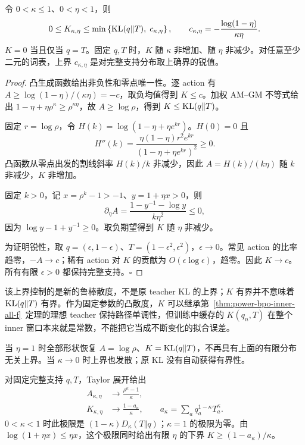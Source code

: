 \begin{theorem}[教师中心的分布无关界]
\label{thm:center-bounds-monotonicity}
令 $0<\kappa\le1$、$0<\eta<1$，则
\begin{equation}
 0\le K_{\kappa,\eta}
 \le\min\left\{\operatorname{KL}(q\Vert T),\;
 c_{\kappa,\eta}\right\},\qquad
 c_{\kappa,\eta}=-\frac{\log(1-\eta)}{\kappa\eta}.
 \label{eq:center-uniform-cap}
\end{equation}
$K=0$ 当且仅当 $q=T$。固定 $q,T$ 时，$K$ 随 $\kappa$ 非增加、随 $\eta$ 非减少。对任意至少二元的词表，上界 $c_{\kappa,\eta}$ 是对完整支持分布取上确界的锐值。
\end{theorem}

\begin{proof}
凸生成函数给出非负性和零点唯一性。逐 action 有 $A\ge\log(1-\eta)/(\kappa\eta)=-c$，取负均值得到 $K\le c$。加权 AM--GM 不等式给出 $1-\eta+\eta\rho^\kappa\ge\rho^{\kappa\eta}$，故 $A\ge\log\rho$，得到 $K\le\operatorname{KL}(q\Vert T)$。

固定 $r=\log\rho$，令 $H(k)=\log(1-\eta+\eta e^{kr})$。$H(0)=0$ 且
\begin{equation}
 H''(k)=\frac{\eta(1-\eta)r^2e^{kr}}{(1-\eta+\eta e^{kr})^2}\ge0.
\end{equation}
凸函数从零点出发的割线斜率 $H(k)/k$ 非减少，因此 $A=H(k)/(k\eta)$ 随 $k$ 非减少，$K$ 非增加。

固定 $k>0$，记 $x=\rho^k-1>-1$、$y=1+\eta x>0$，则
\begin{equation}
 \partial_\eta A=\frac{1-y^{-1}-\log y}{k\eta^2}\le0,
\end{equation}
因为 $\log y-1+y^{-1}\ge0$。取负期望得到 $K$ 随 $\eta$ 非减少。

为证明锐性，取 $q=(\epsilon,1-\epsilon)$、$T=(1-\epsilon^2,\epsilon^2)$，$\epsilon\to0$。常见 action 的比率趋零，$-A\to c$；稀有 action 对 $K$ 的贡献为 $O(\epsilon\log\epsilon)$，趋零。因此 $K\to c$。所有有限 $\epsilon>0$ 都保持完整支持。\hfill$\square$
\end{proof}

该上界控制的是新的鲁棒散度，不是原 teacher KL 的上界；$K$ 有界并不意味着 $\operatorname{KL}(q\Vert T)$ 有界。作为固定参数的凸散度，$K$ 可以继承第~\ref{thm:power-bpo-inner-all-f}~定理的理想 teacher 保持路径单调性，但训练中缓存的 $K(q_n,T)$ 在整个 inner 窗口本来就是常数，不能把它当成不断变化的拟合误差。

当 $\eta=1$ 时全部形状恢复 $A=\log\rho$、$K=\operatorname{KL}(q\Vert T)$，不再具有上面的有限分布无关上界。当 $\kappa\to0$ 时上界也发散；原 KL 没有自动获得有界性。

对固定完整支持 $q,T$，Taylor 展开给出
\begin{align}
 A_{\kappa,\eta}&\longrightarrow\frac{\rho^\kappa-1}{\kappa},\label{eq:divergence-map-center-limit}\\
 K_{\kappa,\eta}&\longrightarrow
 \frac{1-a_\kappa}{\kappa},\qquad
 a_\kappa=\sum_aq_a^{1-\kappa}T_a^\kappa.
 \label{eq:center-small-step-limit}
\end{align}
$0<\kappa<1$ 时此极限是 $(1-\kappa)D_\kappa(T\Vert q)$；$\kappa=1$ 的极限为零。由 $\log(1+\eta x)\le\eta x$，这个极限同时给出有限 $\eta$ 的下界 $K\ge(1-a_\kappa)/\kappa$。

